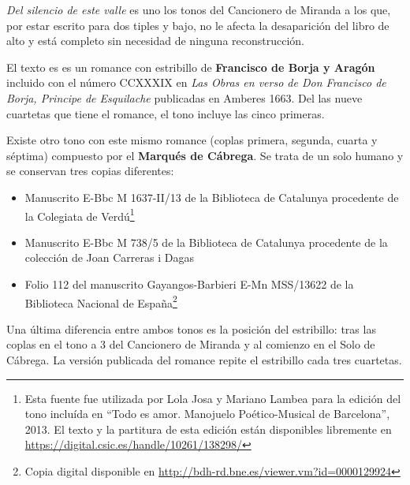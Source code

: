 \textit{Del silencio de este valle} es uno los tonos del Cancionero de
Miranda a los que, por estar escrito para dos tiples y bajo, no le
afecta la desaparición del libro de alto y está completo sin necesidad
de ninguna reconstrucción.

El texto es es un romance con estribillo de \textbf{Francisco de Borja y
Aragón} incluido con el número CCXXXIX en \textit{Las Obras en verso de
Don Francisco de Borja, Principe de Esquilache} publicadas en Amberes
1663. Del las nueve cuartetas que tiene el romance, el tono incluye las
cinco primeras.

Existe otro tono con este mismo romance (coplas primera, segunda, cuarta
y séptima) compuesto por el \textbf{Marqués de Cábrega}. Se trata de un
solo humano y se conservan tres copias diferentes:

\begin{itemize}
\tightlist
\item
  Manuscrito E-Bbc M 1637-II/13 de la Biblioteca de Catalunya procedente
  de la Colegiata de Verdú\footnote{Esta fuente fue utilizada por Lola
    Josa y Mariano Lambea para la edición del tono incluída en ``Todo es
    amor. Manojuelo Poético-Musical de Barcelona'', 2013. El texto y la
    partitura de esta edición están disponibles libremente en
    \url{https://digital.csic.es/handle/10261/138298/}}
\item
  Manuscrito E-Bbc M 738/5 de la Biblioteca de Catalunya procedente de
  la colección de Joan Carreras i Dagas
\item
  Folio 112 del manuscrito Gayangos-Barbieri E-Mn MSS/13622 de la
  Biblioteca Nacional de España\footnote{Copia digital disponible en
    \url{http://bdh-rd.bne.es/viewer.vm?id=0000129924}}
\end{itemize}

Una última diferencia entre ambos tonos es la posición del estribillo:
tras las coplas en el tono a 3 del Cancionero de Miranda y al comienzo
en el Solo de Cábrega. La versión publicada del romance repite el estribillo
cada tres cuartetas.
